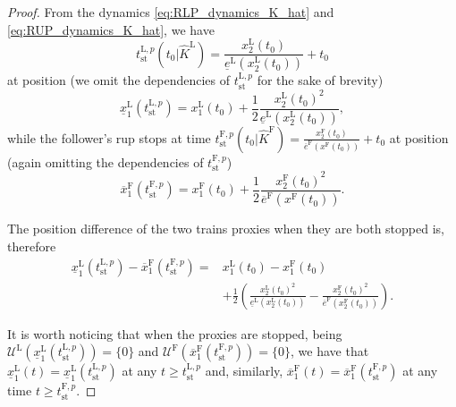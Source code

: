\documentclass[letterpaper, 10 pt, conference]{ieeeconf}
\theoremstyle{definition}
\theoremstyle{nopoint}
\begin{document}
\begin{proof}
	
	From the dynamics  \eqref{eq:RLP_dynamics_K_hat} and \eqref{eq:RUP_dynamics_K_hat}, we have 
	\begin{equation}\label{eq:t_stop_L_P}
		t_{\mathrm{st}}^{\mathrm{L},p}(t_0 |\hat{K}^\mathrm{L}) = \frac{x_2^\mathrm{L}(t_0)}{\underline{e}^\mathrm{L}\left(x_2^\mathrm{L}(t_0)\right)} + t_0
	\end{equation}
	at position (we omit the dependencies of $t_{\mathrm{st}}^{\mathrm{L},p}$ for the sake of brevity)
	\begin{equation}\label{eq:leader_RLP_stop_position}
		\underline{x}_1^\mathrm{L}(t_{\mathrm{st}}^{\mathrm{L},p} )=x_1^\mathrm{L}(t_0)+\frac{1}{2} \frac{{x_2^\mathrm{L}(t_0)}^2}{\underline{e}^\mathrm{L}\left(x_2^\mathrm{L}(t_0)\right)},
	\end{equation}
	while the follower's \gls{rup} stops at time $t_{\mathrm{st}}^{\mathrm{F},p}(t_0 |\hat{K}^\mathrm{F})= \frac{x_2^\mathrm{F}(t_0)}{\overline{e}^\mathrm{F}\left(x^\mathrm{F}(t_0)\right)} + t_0$ at position (again omitting the dependencies of $t_{\mathrm{st}}^{\mathrm{F},p}$)
	\begin{equation}\label{eq:follower_RUP_stop_position}
		\overline{x}_1^\mathrm{F}(t_{\mathrm{st}}^{\mathrm{F},p} )=x_1^\mathrm{F}(t_0)+\frac{1}{2} \frac{{x_2^\mathrm{F}(t_0)}^2}{\overline{e}^\mathrm{F}\left(x^\mathrm{F}(t_0)\right)}.
	\end{equation}
	
	
	The position difference of the two trains proxies when they are both stopped is, therefore
	\begin{equation}\label{eq:proxy_difference}
		\begin{aligned}
			\underline{x}_1^\mathrm{L}(t_{\mathrm{st}}^{\mathrm{L},p} ) - \overline{x}_1^{\mathrm{F}}(t_{\mathrm{st}}^{\mathrm{F},p}  )=&
			x_1^\mathrm{L}(t_0)-x_1^\mathrm{F}(t_0)\\
			&+\frac{1}{2}
			\left(\frac{{x_2^\mathrm{L}(t_0)}^2}{\underline{e}^\mathrm{L}\left(x_2^\mathrm{L}(t_0)\right)}
			-
			\frac{{x_2^\mathrm{F}(t_0)}^2}{\overline{e}^\mathrm{F}\left(x_2^\mathrm{F}(t_0)\right)}
			\right).
		\end{aligned}
	\end{equation}
	
	It is worth noticing that when the proxies are stopped, being $\mathcal{U}^\mathrm{L}(\underline{x}_1^\mathrm{L}(t_{\mathrm{st}}^{\mathrm{L},p} ))=\{0\}$ and $\mathcal{U}^\mathrm{F}(\overline{x}_1^\mathrm{F}(t_{\mathrm{st}}^{\mathrm{F},p}  ))=\{0\}$, we have that $\underline{x}_1^\mathrm{L}(t)=\underline{x}_1^\mathrm{L}(t_{\mathrm{st}}^{\mathrm{L},p} )$ at any $t\geq t_{\mathrm{st}}^{\mathrm{L},p}$ and, similarly, 
	$\overline{x}_1^\mathrm{F}(t)=\overline{x}_1^\mathrm{F}(t_{\mathrm{st}}^{\mathrm{F},p})$ at any time $t\geq t_{\mathrm{st}}^{\mathrm{F},p}$. 
	

\end{proof}
\end{document}
